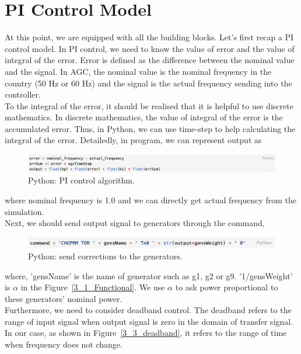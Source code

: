 \section{PI Control Model} %
At this point, we are equipped with all the building blocks. Let's first recap a PI control model. In PI control, we need to know the value of error and the value of integral of the error. Error is defined as the difference between the nominal value and the signal. In AGC, the nominal value is the nominal frequency in the country (50 Hz or 60 Hz) and the signal is the actual frequency sending into the controller. \\

To the integral of the error, it should be realised that it is helpful to use discrete mathematics. In discrete mathematics, the value of integral of the error is the accumulated error. Thus, in Python, we can use time-step to help calculating the integral of the error.  Detailedly, in program, we can represent output as 

\begin{figure}[!htbp]
\center
\includegraphics[scale=0.5]{figure/3_3_code1.png}
\caption{Python: PI control algorithm.}
\label{3_3_code1}
\end{figure}

where nominal frequency is 1.0 and we can directly get actual frequency from the simulation. \\

Next, we should send output signal to generators through the command, 

\begin{figure}[!htbp]
\center
\includegraphics[scale=0.65]{figure/3_3_code2.png}
\caption{Python: send corrections to the generators.}
\label{3_3_code2}
\end{figure}

where, 'gensName' is the name of generator such as g1, g2 or g9. '1/gensWeight' is $\alpha$ in the Figure~\ref{3_1_Functional}. We use $\alpha$ to ask power proportional to these generators' nominal power.\\

Furthermore, we need to consider deadband control. The deadband refers to the range of input signal when output signal is zero in the domain of transfer signal. In our case, as shown in Figure~\ref{3_3_deadband}, it refers to the range of time when frequency does not change.  \\

